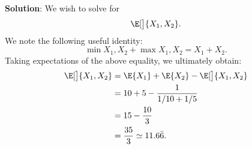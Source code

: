 \begin{Example}
\begin{enumerate}[(a)]
              \textbf{Solution}: We wish to solve for
              \[ \E[\big]{\max{X_1,X_2}}. \]
              We note the following useful identity:
              \[ \min{X_1,X_2}+\max{X_1,X_2}=X_1+X_2. \]
              Taking expectations of the above equality, we ultimately obtain:
              \begin{align*}
                  \E[\big]{\max{X_1,X_2}}
                   & =\E{X_1}+\E{X_2}-\E[\big]{\min{X_1,X_2}} \\
                   & =10+5-\frac{1}{1/10+1/5}                 \\
                   & =15-\frac{10}{3}                         \\
                   & =\frac{35}{3}\simeq 11.6\bar{6}.
              \end{align*}
    \end{enumerate}
\end{Example}
